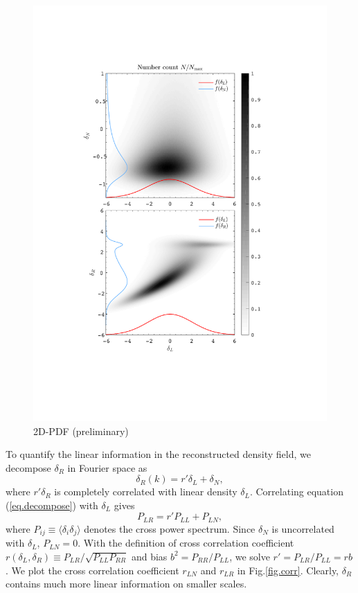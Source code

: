 \documentclass[aps,prd,twocolumn,superscriptaddress,amsfont,amssymb,amsmath,nofootinbib,showpacs,balancelastpage]{revtex4-1}
\begin{document}
\begin{figure}[t] \centering
  \includegraphics[width=1.0\linewidth]{pdfs_300_z0.pdf}
  \caption{2D-PDF (preliminary)}
  \label{fig.pdfs}
\end{figure}

To quantify the linear information in the reconstructed density field, we decompose $\delta_R$ in Fourier space as
\begin{equation}\label{eq.decompose}
    \delta_R(k)=r'\delta_L+\delta_N,
\end{equation}
where $r'\delta_R$ is completely correlated with linear density $\delta_L$. Correlating equation (\ref{eq.decompose}) with $\delta_L$ gives
\begin{equation}
    P_{LR}=r'P_{LL}+P_{LN},
\end{equation}
where $P_{ij}\equiv\langle\delta_i\delta_j\rangle$ denotes the cross power 
spectrum. Since $\delta_N$ is uncorrelated with $\delta_L$, $P_{LN}=0$. With the 
definition of cross correlation coefficient $r(\delta_L,\delta_R)\equiv P_{LR}/\sqrt{P_{LL}P_{RR}}$ 
and bias $b^2=P_{RR}/P_{LL}$, we solve $r'=P_{LR}/P_{LL}=rb$. We plot the cross 
correlation coefficient $r_{LN}$ and $r_{LR}$ in Fig.\ref{fig.corr}. Clearly, $
\delta_R$ contains much more linear information on smaller scales.
\end{document}
